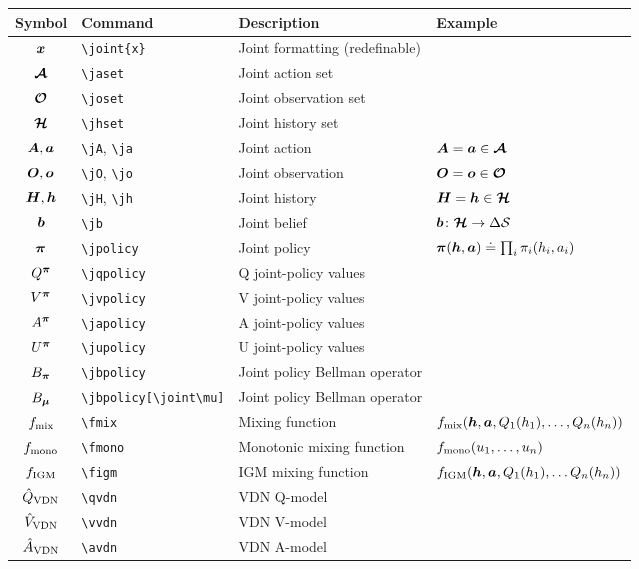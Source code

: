 \documentclass{article}
\begin{document}
\begin{tabular}{clll}
  \toprule
  Symbol & Command & Description & Example \\
  \midrule
  $\joint{x}$ & \verb|\joint{x}| & Joint formatting (redefinable) \\
  \midrule
  $\jaset$ & \verb|\jaset| & Joint action set \\
  $\joset$ & \verb|\joset| & Joint observation set \\
  $\jhset$ & \verb|\jhset| & Joint history set \\
  \midrule
  $\jA, \ja$ & \verb|\jA|, \verb|\ja| & Joint action & $\jA = \ja\in\jaset$ \\
  $\jO, \jo$ & \verb|\jO|, \verb|\jo| & Joint observation & $\jO = \jo\in\joset$ \\
  $\jH, \jh$ & \verb|\jH|, \verb|\jh| & Joint history & $\jH = \jh\in\jhset$ \\
  $\jb$ & \verb|\jb| & Joint belief & $\jb \colon\jhset \to\Delta\sset$ \\
  \midrule
  $\jpolicy$ & \verb|\jpolicy| & Joint policy & $\jpolicy(\jh, \ja) \doteq \prod_i \policy_i(h_i, a_i)$ \\
  \midrule
  $\jqpolicy$ & \verb|\jqpolicy| & Q joint-policy values \\
  $\jvpolicy$ & \verb|\jvpolicy| & V joint-policy values \\
  $\japolicy$ & \verb|\japolicy| & A joint-policy values \\
  $\jupolicy$ & \verb|\jupolicy| & U joint-policy values \\
  \midrule
  $\jbpolicy$ & \verb|\jbpolicy| & Joint policy Bellman operator \\
  $\jbpolicy[\joint\mu]$ & \verb|\jbpolicy[\joint\mu]| & Joint policy Bellman operator \\
  \midrule
  $\fmix$ & \verb|\fmix| & Mixing function & $\fmix(\jh, \ja, Q_1(h_1), \ldots, Q_n(h_n))$ \\
  $\fmono$ & \verb|\fmono| & Monotonic mixing function & $\fmono(u_1, \ldots, u_n)$ \\
  $\figm$ & \verb|\figm| & IGM mixing function & $\figm(\jh, \ja, Q_1(h_1), \ldots Q_n(h_n))$ \\
  \midrule
  $\qvdn$ & \verb|\qvdn| & VDN Q-model \\
  $\vvdn$ & \verb|\vvdn| & VDN V-model \\
  $\avdn$ & \verb|\avdn| & VDN A-model \\

\end{tabular}
\end{document}
